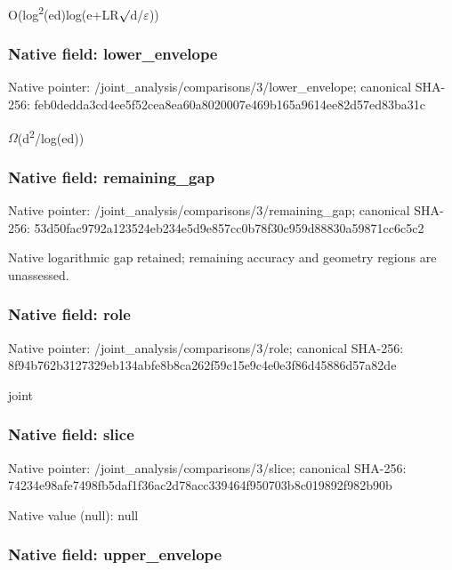 \documentclass[10pt,a4paper]{article}
\begin{document}
O(log\textsuperscript{2}(ed)log(e+LR\ensuremath{\sqrt{\vphantom{x}}}d/\ensuremath{\varepsilon}))


\subsubsection{Native field: lower\_envelope}


Native pointer: /joint\_analysis/comparis\allowbreak{}ons/3/lower\_envelope; canonical SHA-256: feb0dedda3cd4ee5f52cea8e\allowbreak{}a60a8020007e469b165a9614\allowbreak{}ee82d57ed83ba31c


\ensuremath{\Omega}(d\textsuperscript{2}/log(ed))


\subsubsection{Native field: remaining\_gap}


Native pointer: /joint\_analysis/comparis\allowbreak{}ons/3/remaining\_gap; canonical SHA-256: 53d50fac9792a123524eb234\allowbreak{}e5d9e857cc0b78f30c959d88\allowbreak{}830a59871cc6c5c2


Native logarithmic gap retained; remaining accuracy and geometry regions are unassessed.


\subsubsection{Native field: role}


Native pointer: /joint\_analysis/comparisons/3/role; canonical SHA-256: 8f94b762b3127329eb134abf\allowbreak{}e8b8ca262f59c15e9c4e0e3f\allowbreak{}86d45886d57a82de


joint


\subsubsection{Native field: slice}


Native pointer: /joint\_analysis/comparisons/3/slice; canonical SHA-256: 74234e98afe7498fb5daf1f3\allowbreak{}6ac2d78acc339464f950703b\allowbreak{}8c019892f982b90b



Native value (null): null



\subsubsection{Native field: upper\_envelope}
\end{document}
